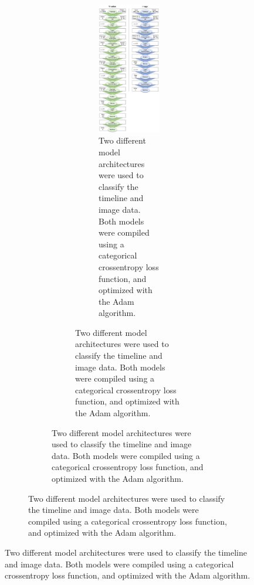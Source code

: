 \documentclass[
  english,
  man, donotrepeattitle,floatsintext]{apa6}
\begin{document}
\begin{figure}
\begin{figure}
\begin{figure}
\begin{figure}
\begin{figure}
\centering
\includegraphics{figures/models.pdf}
\caption{\label{fig:models}Two different model architectures were used to classify the timeline and image data. Both models were compiled using a categorical crossentropy loss function, and optimized with the Adam algorithm.}
\end{figure}


\end{figure}
\end{figure}
\end{figure}
\end{figure}
\end{document}
